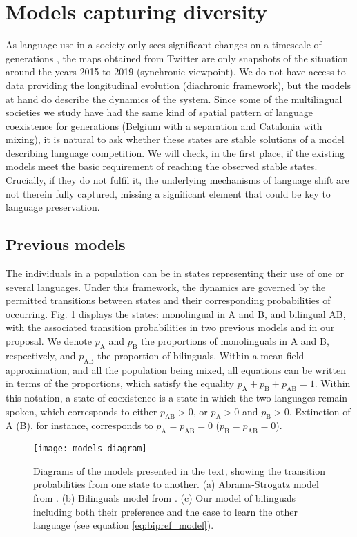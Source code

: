 \documentclass[../thesis.tex]{subfiles}
\begin{document}
\section{Models capturing diversity} 
As language use in a society only sees significant changes on a timescale of
generations \cite{LabovSociolinguisticPatterns1973}, the maps obtained from Twitter are
only snapshots of the situation around the years 2015 to 2019 (synchronic viewpoint). We
do not have access to data providing the longitudinal evolution (diachronic framework),
but the models at hand do describe the dynamics of the system. Since some of the
multilingual societies we study have had the same kind of spatial pattern of language
coexistence for generations (Belgium with a separation and Catalonia with mixing), it is
natural to ask whether these states are stable solutions of a model describing language
competition. We will check, in the first place, if the existing models meet the basic
requirement of reaching the observed stable states. Crucially, if they do not fulfil
it, the underlying mechanisms of language shift are not therein fully captured, missing
a significant element that could be key to language preservation.


\subsection{Previous models}
The individuals in a population can be in states representing their use of one or
several languages. Under this framework, the dynamics are governed by the permitted
transitions between states and their corresponding probabilities of occurring. Fig.
\cref{fig:models_diagram} displays the states: monolingual in A and B, and bilingual AB,
with the associated transition probabilities in two previous models and in our proposal.
We denote $p_{\text{A}}$ and $p_{\text{B}}$ the proportions of monolinguals in A and B,
respectively, and $p_{\text{AB}}$ the proportion of bilinguals. Within a mean-field
approximation, and all the population being mixed, all equations can be written in terms
of the proportions, which satisfy the equality $p_{\text{A}} + p_{\text{B}} +
p_{\text{AB}} = 1$. Within this notation, a state of coexistence is a state in which the
two languages remain spoken, which corresponds to either $p_{\text{AB}} > 0$, or
$p_{\text{A}} > 0$ and $p_{\text{B}} > 0$. Extinction of A (B), for instance,
corresponds to $p_{\text{A}} = p_{\text{AB}} = 0$ ($p_{\text{B}} = p_{\text{AB}} = 0$).
\begin{figure}
\centering
    \texttt{[image: models\_diagram]}
    \caption{Diagrams of the models presented in the text, showing the transition
    probabilities from one state to another. (a) Abrams-Strogatz model from
    \cite{AbramsModellingDynamics2003}. (b) Bilinguals model from
    \cite{CastelloOrderingDynamics2006}. (c) Our model of bilinguals including
    both their preference and the ease to learn the other language (see equation
    \eqref{eq:bipref_model}).}
    \label{fig:models_diagram}
\end{figure}
\end{document}

